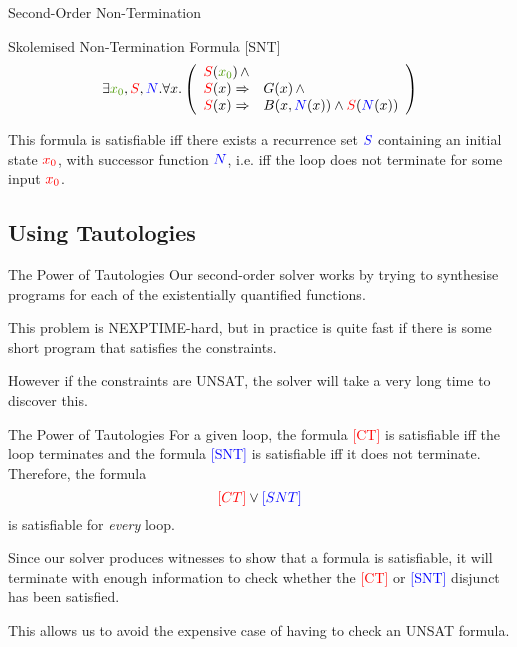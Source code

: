 \documentclass[xcolor=pdftex,t,11pt]{beamer}
\newcommand{\red}[1]{\textcolor{red}{#1}}
\newcommand{\blue}[1]{\textcolor{blue}{#1}}
\newcommand{\green}[1]{\textcolor{ta3chameleon}{#1}}
\begin{document}
\begin{frame}{Second-Order Non-Termination}

\begin{block}{Skolemised Non-Termination Formula [SNT]}
 \[
 \exists \green{x_0}, \red{S}, \blue{N} . \forall x . \left ( \begin{array}{rl}
   \red{S}(\green{x_0}) \, \wedge & \\
   \red{S}(x) \Rightarrow & G(x) \, \wedge \\
   \red{S}(x) \Rightarrow & B(x, \blue{N}(x)) \wedge \red{S}(\blue{N}(x))
   \end{array} \right )
 \]
 \end{block}

 \vspace{1em}

This formula is satisfiable iff there exists a recurrence set $\blue{S}$ containing
an initial state $\red{x_0}$, with successor function $\blue{N}$, i.e. iff the loop
does not terminate for some input $\red{x_0}$.
\end{frame}

\subsection{Using Tautologies}

\begin{frame}{The Power of Tautologies}
 Our second-order solver works by trying to synthesise programs for each of the existentially quantified functions.

 \vspace{1em}

 This problem is NEXPTIME-hard, but in practice is quite fast if there is some short program that satisfies
 the constraints.

 \vspace{1em}

 However if the constraints are UNSAT, the solver will take a very long time to discover this.
\end{frame}

\begin{frame}{The Power of Tautologies}
 For a given loop, the formula \red{[CT]} is satisfiable iff the loop terminates and the formula \blue{[SNT]} is
 satisfiable iff it does not terminate.  Therefore, the formula
 \[
  \red{\text[CT]} \vee \blue{\text[SNT]}
 \]
 is satisfiable for \emph{every} loop.

 \vspace{1em}

 Since our solver produces witnesses to show that a formula is satisfiable, it will terminate with enough
 information to check whether the \red{[CT]} or \blue{[SNT]} disjunct has been satisfied.

 \vspace{1em}

 This allows us to avoid the expensive case of having to check an UNSAT formula.
\end{frame}
\end{document}
